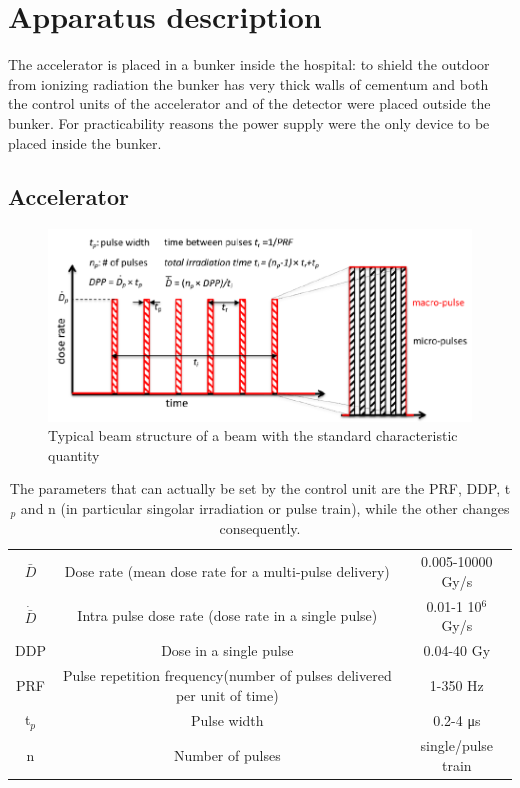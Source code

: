\section{Apparatus description}
   The accelerator is placed in a bunker inside the hospital: to shield the outdoor from ionizing radiation the bunker has very thick walls of cementum and both the control units of the accelerator and of the detector were placed outside the bunker. 
   For practicability reasons the power supply were the only device to be placed inside the bunker. 
   \subsection{Accelerator}
      \begin{figure}
         \centering
         \includegraphics[width=.9\linewidth]{figures/test_beam/beam_structure.pdf}
         \caption{Typical beam structure of a beam with the standard characteristic quantity}
         \label{fig:beam_structure}
      \end{figure}
      \begin{table}
         \begin{center}
         \begin{tabular}{| c | c | c |}
         \hline
      $\bar{D}$ & Dose rate (mean dose rate for a multi-pulse delivery) & 0.005-10000 Gy/s\\
      $\Dot{\bar{D}}$ & Intra pulse dose rate (dose rate in a single pulse) &  0.01-1 10$^6$ Gy/s  \\
      DDP & Dose in a single pulse & 0.04-40 Gy\\
      PRF & Pulse repetition frequency(number of pulses delivered per unit of time) & 1-350 Hz\\
      t$_{p}$ & Pulse width & 0.2-4 \si{\us}\\
      n & Number of pulses & single/pulse train \\
      \hline
         \end{tabular}
         \caption{The parameters that can actually be set by the control unit are the PRF, DDP, t$_p$ and n (in particular singolar irradiation or pulse train), while the other changes consequently.}
         \label{tab:beam_parameters}
         \end{center}
      \end{table}  
